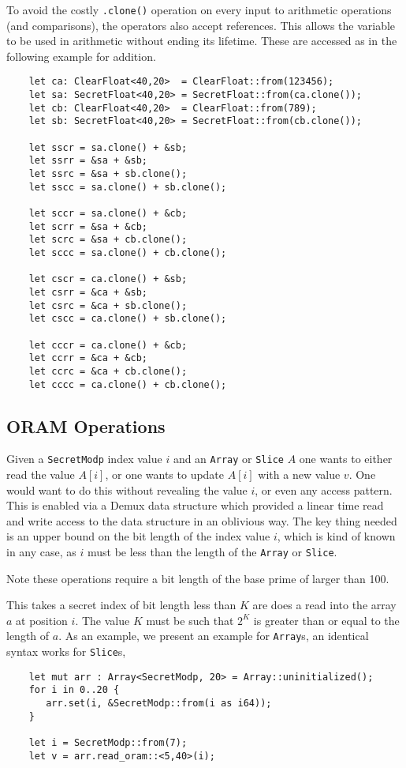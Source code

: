 To avoid the costly \verb|.clone()| operation on every input to arithmetic 
operations (and comparisons), the operators also accept references. This 
allows the variable to be used in arithmetic without ending its lifetime.
These are accessed as in the following example for addition.
\begin{lstlisting}
    let ca: ClearFloat<40,20>  = ClearFloat::from(123456);
    let sa: SecretFloat<40,20> = SecretFloat::from(ca.clone());
    let cb: ClearFloat<40,20>  = ClearFloat::from(789);
    let sb: SecretFloat<40,20> = SecretFloat::from(cb.clone());

    let sscr = sa.clone() + &sb;
    let ssrr = &sa + &sb;
    let ssrc = &sa + sb.clone();
    let sscc = sa.clone() + sb.clone();

    let sccr = sa.clone() + &cb;
    let scrr = &sa + &cb;
    let scrc = &sa + cb.clone();
    let sccc = sa.clone() + cb.clone();

    let cscr = ca.clone() + &sb;
    let csrr = &ca + &sb;
    let csrc = &ca + sb.clone();
    let cscc = ca.clone() + sb.clone();

    let cccr = ca.clone() + &cb;
    let ccrr = &ca + &cb;
    let ccrc = &ca + cb.clone();
    let cccc = ca.clone() + cb.clone();
\end{lstlisting}

\subsection{ORAM Operations}
Given a \verb|SecretModp| index value $i$ and an \verb|Array| or
\verb|Slice| $A$ one wants to either read the value $A[i]$, or
one wants to update $A[i]$ with a new value $v$. One would want
to do this without revealing the value $i$, or even any access
pattern.
This is enabled via a Demux data structure which provided a linear
time read and write access to the data structure in an oblivious way.
The key thing needed is an upper bound on the bit length of the
index value $i$, which is kind of known in any case, as $i$ must
be less than the length of the  \verb|Array| or \verb|Slice|.

Note these operations require a bit length of the base prime of
larger than 100.

This takes a secret index of bit length less than $K$ are does a
read into the array $a$ at position $i$.
The value $K$ must be such that $2^K$ is greater than or equal
to the length of $a$.
As an example, we present an example for \verb|Array|s,
an identical syntax works for \verb|Slice|s,
\begin{lstlisting}
    let mut arr : Array<SecretModp, 20> = Array::uninitialized();
    for i in 0..20 {
       arr.set(i, &SecretModp::from(i as i64));
    }

    let i = SecretModp::from(7);
    let v = arr.read_oram::<5,40>(i);
\end{lstlisting}

